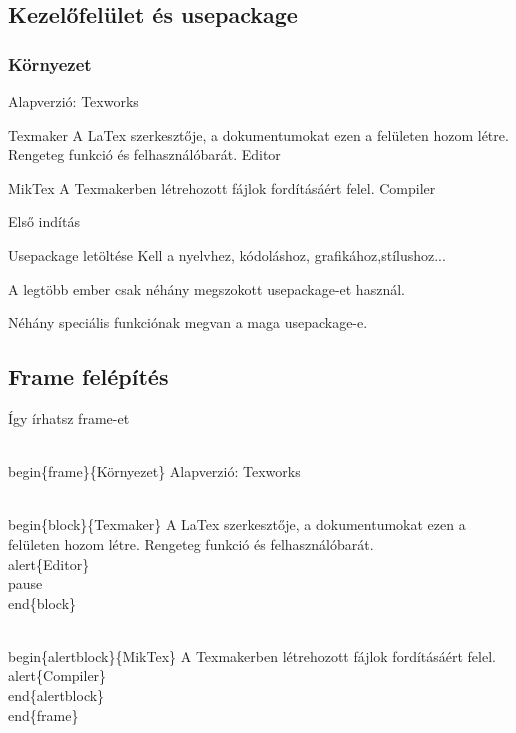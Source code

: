 \documentclass[11pt]{beamer}
\begin{document}
\subsection{Kezelőfelület és usepackage}

\begin{frame}
\frametitle{Környezet}
Alapverzió: Texworks

\begin{block}{Texmaker}
A LaTex szerkesztője, a dokumentumokat ezen a felületen hozom létre. Rengeteg funkció és felhasználóbarát. \alert{Editor} \pause
\end{block}

\begin{alertblock}{MikTex}
A Texmakerben létrehozott fájlok fordításáért felel. \alert{Compiler}
\end{alertblock}
\end{frame}

\begin{frame}{Első indítás}
\begin{block}{Usepackage letöltése}
Kell a nyelvhez, kódoláshoz, grafikához,stílushoz...
\end{block}

A legtöbb ember csak néhány megszokott usepackage-et használ.

Néhány speciális funkciónak megvan a maga usepackage-e.
\end{frame}

\subsection{Frame felépítés}

\begin{frame}[fragile]{Így írhatsz frame-et}
\begin{semiverbatim}
\\begin\{frame\}\{Környezet\}
Alapverzió: Texworks

\\begin\{block\}\{Texmaker\}
A LaTex szerkesztője, a dokumentumokat ezen a felületen 
hozom létre. Rengeteg funkció és felhasználóbarát.
 \\alert\{Editor\} \\pause
\\end\{block\}

\\begin\{alertblock\}\{MikTex\}
A Texmakerben létrehozott fájlok fordításáért felel.
 \\alert\{Compiler\}
\\end\{alertblock\}
\\end\{frame\}
\end{semiverbatim}
\end{frame}
\end{document}
